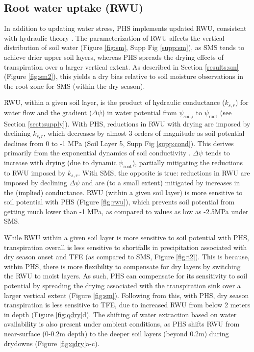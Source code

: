 \documentclass[draft,linenumbers]{agujournal}
\begin{document}
\subsection{Root water uptake (RWU)}

In addition to updating water stress, PHS implements updated RWU, consistent with hydraulic theory \citep{cai2018,warren2015}.
The parameterization of RWU affects the vertical distribution of soil water (Figure \ref{fig:sm}, Supp Fig \ref{supp:sm}), as
SMS tends to achieve drier upper soil layers, whereas PHS spreads the drying effects of transpiration over a larger vertical extent.
As described in Section \ref{results:sm} (Figure \ref{fig:sm2}), this yields a dry bias relative to soil moisture observations in the root-zone for SMS (within the dry season).

RWU, within a given soil layer, is the product of hydraulic conductance ($k_{s,r}$) for water flow and the gradient ($\Delta\psi$) in water potential from $\psi_{\text{soil,i}}$ to $\psi_\text{root}$ (see Section \ref{sect:supply}).
With PHS, reductions in RWU with drying are imposed by declining $k_{s,r}$, which decreases by almost 3 orders of magnitude as soil potential declines from 0 to -1 MPa (Soil Layer 5, Supp Fig \ref{supp:cond}).
This derives primarily from the exponential dynamics of soil conductivity \citep{brooks1964}.
$\Delta\psi$ tends to increase with drying (due to dynamic $\psi_{\text{root}}$), partially mitigating the reductions to RWU imposed by $k_{s,r}$.
With SMS, the opposite is true: reductions in RWU are imposed by declining $\Delta\psi$ and are (to a small extent) mitigated by increases in the (implied) conductance. 
RWU (within a given soil layer) is more sensitive to soil potential with PHS (Figure \ref{fig:rwu}), which prevents soil potential from getting much lower than -1 MPa, as compared to values as low as -2.5MPa under SMS.

While RWU within a given soil layer is more sensitive to soil potential with PHS, transpiration overall is less sensitive to shortfalls in precipitation
associated with dry season onset and TFE (as compared to SMS, Figure \ref{fig:t2}).
This is because, within PHS, there is more flexibility to compensate for dry layers by switching the RWU to moist layers.
As such, PHS can compensate for its sensitivity to soil potential by spreading the drying associated with the transpiration sink over a larger vertical extent (Figure \ref{fig:sm}).
Following from this, with PHS, dry season transpiration is less sensitive to TFE, due to increased RWU from below 2 meters in depth (Figure \ref{fig:qdry}d).
The shifting of water extraction based on water availability is also present under ambient conditions, as PHS shifts RWU from near-surface (0-0.2m depth) to the deeper soil layers (beyond 0.2m) during drydowns (Figure \ref{fig:qdry}a-c).
\end{document}
